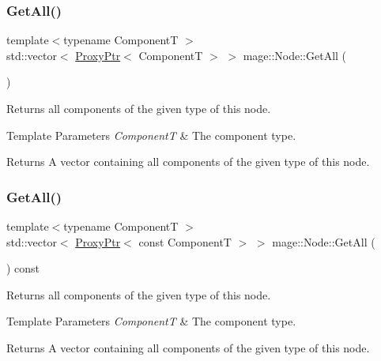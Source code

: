 \subsubsection{\texorpdfstring{Get\+All()}{GetAll()}\hspace{0.1cm}{\footnotesize\ttfamily [1/2]}}
{\footnotesize\ttfamily template$<$typename ComponentT $>$ \\
std\+::vector$<$ \hyperlink{classmage_1_1_proxy_ptr}{Proxy\+Ptr}$<$ ComponentT $>$ $>$ mage\+::\+Node\+::\+Get\+All (\begin{DoxyParamCaption}{ }\end{DoxyParamCaption})}

Returns all components of the given type of this node.


\begin{DoxyTemplParams}{Template Parameters}
{\em ComponentT} & The component type. \\
\hline
\end{DoxyTemplParams}
\begin{DoxyReturn}{Returns}
A vector containing all components of the given type of this node. 
\end{DoxyReturn}
\hypertarget{classmage_1_1_node_a6e758fb0114ae432b25d987d44168faa}{}\label{classmage_1_1_node_a6e758fb0114ae432b25d987d44168faa} 
\subsubsection{\texorpdfstring{Get\+All()}{GetAll()}\hspace{0.1cm}{\footnotesize\ttfamily [2/2]}}
{\footnotesize\ttfamily template$<$typename ComponentT $>$ \\
std\+::vector$<$ \hyperlink{classmage_1_1_proxy_ptr}{Proxy\+Ptr}$<$ const ComponentT $>$ $>$ mage\+::\+Node\+::\+Get\+All (\begin{DoxyParamCaption}{ }\end{DoxyParamCaption}) const}

Returns all components of the given type of this node.


\begin{DoxyTemplParams}{Template Parameters}
{\em ComponentT} & The component type. \\
\hline
\end{DoxyTemplParams}
\begin{DoxyReturn}{Returns}
A vector containing all components of the given type of this node. 
\end{DoxyReturn}
\hypertarget{classmage_1_1_node_a41474294afb1064796ff8a75413734f3}{}\label{classmage_1_1_node_a41474294afb1064796ff8a75413734f3} 

